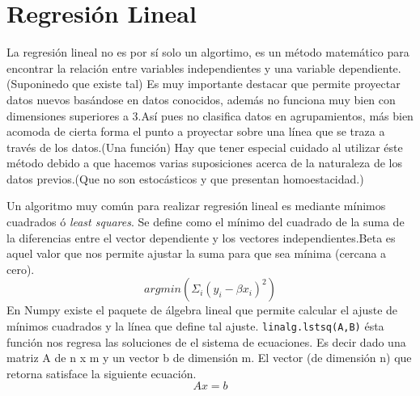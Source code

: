 \documentclass{article}
\begin{document}
\section{Regresión Lineal}

La regresión lineal no es por sí solo un algortimo, es un método matemático para encontrar la relación entre variables independientes y una variable dependiente.(Suponinedo que existe tal)
Es muy importante destacar que permite proyectar datos nuevos basándose en datos conocidos, además no funciona muy bien con dimensiones superiores a 3.Así pues no clasifica datos en agrupamientos, más bien acomoda de cierta forma el punto a proyectar sobre una línea que se traza a través de los datos.(Una función) Hay que tener especial cuidado al utilizar éste método debido a que hacemos varias suposiciones acerca de la naturaleza de los datos previos.(Que no son estocásticos y que presentan homoestacidad.)


Un algoritmo muy común para realizar regresión lineal es mediante mínimos cuadrados ó \textit{least squares}.
Se define como el mínimo del cuadrado de la suma de la diferencias entre el vector dependiente y los vectores independientes.Beta es aquel valor que nos permite ajustar la suma para que sea mínima (cercana a cero).
$$ argmin(\Sigma_i (y_i - \beta x_i)^2) $$
En Numpy existe el paquete de álgebra lineal que permite calcular el ajuste de mínimos cuadrados y la línea que define tal ajuste.
\verb#linalg.lstsq(A,B)# ésta función nos regresa las soluciones de el sistema de ecuaciones.
Es decir dado una matriz A de n x m y un vector b de dimensión m.
El vector (de dimensión n) que retorna satisface la siguiente ecuación.
$$ Ax = b $$
\end{document}
